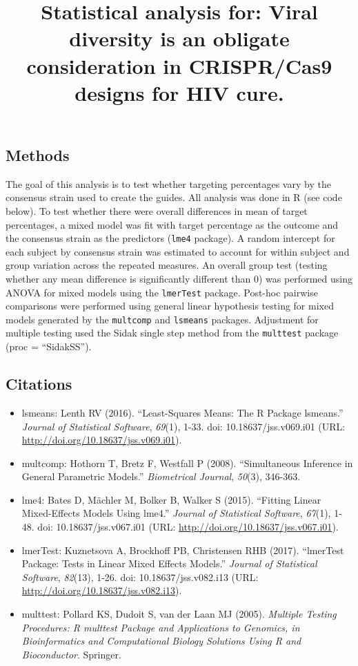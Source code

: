 \documentclass[]{article}
\title{Statistical analysis for: Viral diversity is an obligate consideration
in CRISPR/Cas9 designs for HIV cure.}
\author{}
\date{}
\begin{document}
\maketitle

\subsection{Methods}\label{methods}

The goal of this analysis is to test whether targeting percentages vary
by the consensus strain used to create the guides. All analysis was done
in R (see code below). To test whether there were overall differences in
mean of target percentages, a mixed model was fit with target percentage
as the outcome and the consensus strain as the predictors (\texttt{lme4}
package). A random intercept for each subject by consensus strain was
estimated to account for within subject and group variation across the
repeated measures. An overall group test (testing whether any mean
difference is significantly different than 0) was performed using ANOVA
for mixed models using the \texttt{lmerTest} package. Post-hoc pairwise
comparisons were performed using general linear hypothesis testing for
mixed models generated by the \texttt{multcomp} and \texttt{lsmeans}
packages. Adjustment for multiple testing used the Sidak single step
method from the \texttt{multtest} package (proc = ``SidakSS'').

\subsection{Citations}\label{citations}

\begin{itemize}
\item
  lsmeans: Lenth RV (2016). ``Least-Squares Means: The R Package
  lsmeans.'' \emph{Journal of Statistical Software}, \emph{69}(1), 1-33.
  doi: 10.18637/jss.v069.i01 (URL:
  \url{http://doi.org/10.18637/jss.v069.i01}).
\item
  multcomp: Hothorn T, Bretz F, Westfall P (2008). ``Simultaneous
  Inference in General Parametric Models.'' \emph{Biometrical Journal},
  \emph{50}(3), 346-363.
\item
  lme4: Bates D, Mächler M, Bolker B, Walker S (2015). ``Fitting Linear
  Mixed-Effects Models Using lme4.'' \emph{Journal of Statistical
  Software}, \emph{67}(1), 1-48. doi: 10.18637/jss.v067.i01 (URL:
  \url{http://doi.org/10.18637/jss.v067.i01}).
\item
  lmerTest: Kuznetsova A, Brockhoff PB, Christensen RHB (2017).
  ``lmerTest Package: Tests in Linear Mixed Effects Models.''
  \emph{Journal of Statistical Software}, \emph{82}(13), 1-26. doi:
  10.18637/jss.v082.i13 (URL:
  \url{http://doi.org/10.18637/jss.v082.i13}).
\item
  multtest: Pollard KS, Dudoit S, van der Laan MJ (2005). \emph{Multiple
  Testing Procedures: R multtest Package and Applications to Genomics,
  in Bioinformatics and Computational Biology Solutions Using R and
  Bioconductor}. Springer.
\end{itemize}
\end{document}

